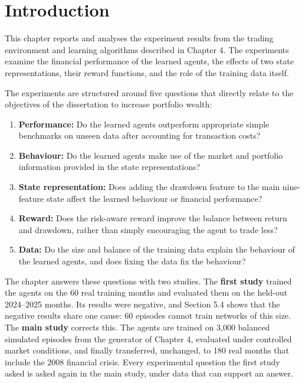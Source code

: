\section{Introduction}

This chapter reports and analyses the experiment results from the
trading environment and learning algorithms described in Chapter 4. The
experiments examine the financial performance of the learned agents, the
effects of two state representations, their reward functions, and the
role of the training data itself.

The experiments are structured around five questions that directly
relate to the objectives of the dissertation to increase portfolio
wealth:

\begin{enumerate}
\def\labelenumi{\arabic{enumi}.}
\item
  \textbf{Performance:} Do the learned agents outperform appropriate
  simple benchmarks on unseen data after accounting for transaction
  costs?
\item
  \textbf{Behaviour:} Do the learned agents make use of the market and
  portfolio information provided in the state representations?
\item
  \textbf{State representation:} Does adding the drawdown feature to the
  main nine-feature state affect the learned behaviour or financial
  performance?
\item
  \textbf{Reward:} Does the risk-aware reward improve the balance
  between return and drawdown, rather than simply encouraging the agent
  to trade less?
\item
  \textbf{Data:} Do the size and balance of the training data explain
  the behaviour of the learned agents, and does fixing the data fix the
  behaviour?
\end{enumerate}

The chapter answers these questions with two studies.
The \textbf{first study} trained the agents on the 60 real training
months and evaluated them on the held-out 2024--2025 months. Its results
were negative, and Section 5.4 shows that the negative results share one
cause: 60 episodes cannot train networks of this size. The \textbf{main
study} corrects this. The agents are trained on 3,000 balanced simulated
episodes from the generator of Chapter 4, evaluated under controlled
market conditions, and finally transferred, unchanged, to 180 real months
that include the 2008 financial crisis. Every experimental question the
first study asked is asked again in the main study, under data that can
support an answer.


